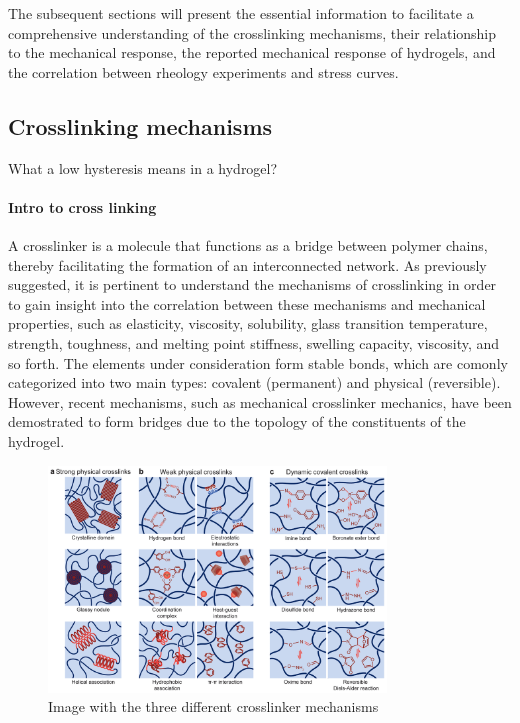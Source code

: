 The subsequent sections will present the essential information to facilitate a comprehensive understanding of the crosslinking mechanisms, their relationship to the mechanical response, the reported mechanical response of hydrogels, and the correlation between rheology experiments and stress curves.

\subsection{Crosslinking mechanisms}\label{ch1:Cross-linking}

What a low hysteresis means in a hydrogel?

\paragraph{Intro to cross linking}
A crosslinker is a molecule that functions as a bridge between polymer chains, thereby facilitating the formation of an interconnected network.
As previously suggested, it is pertinent to understand the mechanisms of crosslinking in order to gain insight into the correlation between these mechanisms and mechanical properties, such as elasticity, viscosity, solubility, glass transition temperature, strength, toughness, and melting point stiffness, swelling capacity, viscosity, and so forth\citep{priyaComprehensiveReviewHydrogel2024}.
The elements under consideration form stable bonds, which are comonly categorized into two main types: covalent (permanent) and physical (reversible)\citep{bustamante-torresHydrogelsClassificationAccording2021}.
However, recent mechanisms, such as mechanical crosslinker mechanics, have been demostrated to form bridges due to the topology of the constituents of the hydrogel.

\begin{figure}[!h]
    \centering
    \includegraphics[width=0.8\textwidth]{pics/crosslinker_mechanisms.png}
    \caption{Image with the three different crosslinker mechanisms}
\end{figure}

